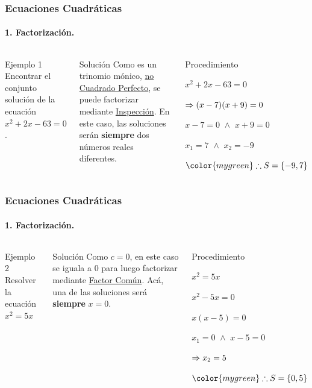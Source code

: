 \documentclass[mathserif]{beamer}
\begin{document}
\begin{frame}
\frametitle{\bf Ecuaciones Cuadráticas} 
\framesubtitle{1. Factorización.}

    \begin{columns}
        \begin{exampleblock}{Ejemplo 1}
        Encontrar el conjunto solución de la ecuación $x^2+2x-63=0$.
        \end{exampleblock}
\pause
        \begin{block}{Solución}
        Como es un trinomio mónico, \underline{no Cuadrado Perfecto}, se puede facto\-ri\-zar mediante \underline{Inspección}. En este caso, las soluciones serán \alert<2>{\bf siempre} dos números reales diferentes. 
        \end{block}
\pause
        \begin{block}{Procedimiento}
            \benu
            \item[] <4-| alert@4>$x^2+2x-63=0$
            \item[] <5-| alert@5>$\Rightarrow (x-7)(x+9)=0$
            \item[] <6-| alert@6>$x-7=0\,\,\wedge\,\,x+9=0$
            \item[] <7-| alert@7>$x_1=7\,\,\wedge\,\,x_2=-9$
            \item[] <8->{\bm $\color{mygreen}\tf S=\{-9,7\}$}
            \eenu
        \end{block}
    \end{columns}
\end{frame}


\begin{frame}
\frametitle{\bf Ecuaciones Cuadráticas} 
\framesubtitle{1. Factorización.}

    \begin{columns}
        \begin{exampleblock}{Ejemplo 2}
        \bc
        Resolver la ecuación $x^2=5x$
        \ec
        \end{exampleblock}
\pause
        \begin{block}{Solución}
        Como $c=0$, en este caso se iguala a $0$ para luego factorizar mediante \underline{Factor Común}. Acá, una de las soluciones será \alert<2>{\bf siempre} $x=0$. 
        \end{block}
\pause
        \begin{block}{Procedimiento}
            \benu
            \item[] <4-| alert@4>$x^2=5x$
            \item[] <5-| alert@5>$x^2-5x=0$
            \item[] <6-| alert@6>$x(x-5)=0$
            \item[] <7-| alert@7> $x_1=0\,\,\wedge\,\,x-5=0$
            \item[] <8-| alert@8>$\Rightarrow x_2=5$
            \item[] <9->{\bm $\color{mygreen}\tf S=\{0,5\}$}
            \eenu
        \end{block}
    \end{columns}
\end{frame}
\end{document}
